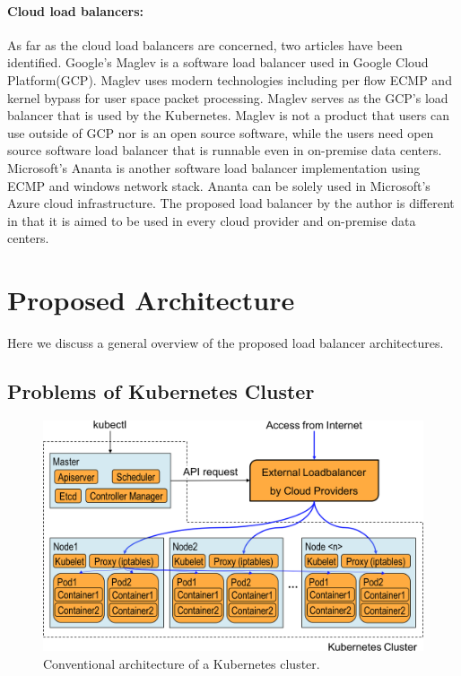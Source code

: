 \paragraph{\bf Cloud load balancers:}

As far as the cloud load balancers are concerned, two articles have been identified.
Google's Maglev\cite{eisenbud2016maglev} is a software load balancer used in Google Cloud Platform(GCP).
Maglev uses modern technologies including per flow ECMP and kernel bypass for user space packet processing.
Maglev serves as the GCP's load balancer that is used by the Kubernetes.
Maglev is not a product that users can use outside of GCP nor is an open source software, while the users need open source software load balancer that is runnable even in on-premise data centers.
Microsoft's Ananta\cite{patel2013ananta} is another software load balancer implementation using ECMP and windows network stack.
Ananta can be solely used in Microsoft's Azure cloud infrastructure\cite{patel2013ananta}.
The proposed load balancer by the author is different in that it is aimed to be used in every cloud provider and on-premise data centers.

\section{Proposed Architecture}\label{Proposed Architecture}

Here we discuss a general overview of the proposed load balancer architectures.


\subsection{Problems of Kubernetes Cluster}

\begin{figure}[tb]
\includegraphics[width=\columnwidth]{Figs/K8sConventional}
\caption{Conventional architecture of a Kubernetes cluster.}
\label{fig:K8sConventional}
\end{figure}

